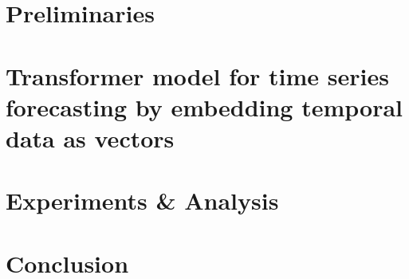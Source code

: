 \section{Preliminaries}


\section{Transformer model for time series forecasting by embedding temporal data as vectors} %





\section{Experiments \& Analysis}\label{sec:ExpRes}


\section{Conclusion}





\appendix
%

